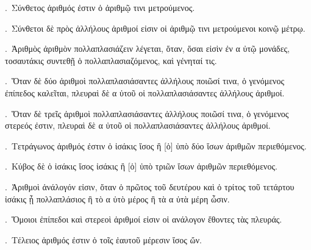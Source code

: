 \begin{Parallel}{}{}
{.~{\greekfont Σύνθετος ἀριθμός ἐστιν ὁ ἀριθμῷ τινι μετρούμενος.}

.~{\greekfont Σύνθετοι δὲ πρὸς ἀλλήλους ἀριθμοί εἰσιν οἱ ἀριθμῷ τινι μετρούμενοι κοινῷ μέτρῳ.}

.~{\greekfont Ἀριθμὸς ἀριθμὸν πολλαπλασιάζειν λέγεται, ὅταν, ὅσαι
εἰσὶν ἐν α ὐτῷ μονάδες, τοσαυτάκις συντεθῇ ὁ πολλαπλασιαζόμενος,
καὶ γένηταί τις.}

.~{\greekfont Ὅταν δὲ δύο ἀριθμοὶ πολλαπλασιάσαντες ἀλλήλους ποιῶσί τινα, ὁ γενόμενος ἐπίπεδος καλεῖται, πλευραὶ δὲ α ὐτοῦ οἱ
πολλαπλασιάσαντες ἀλλήλους ἀριθμοί.}

.~{\greekfont Ὅταν δὲ τρεῖς ἀριθμοὶ πολλαπλασιάσαντες ἀλλήλους ποιῶσί τινα, ὁ γενόμενος στερεός ἐστιν, πλευραὶ δὲ α ὐτοῦ οἱ
πολλαπλασιάσαντες ἀλλήλους ἀριθμοί.}

.~{\greekfont Τετράγωνος ἀριθμός ἐστιν ὁ ἰσάκις ἴσος ἢ [ὁ]
ὑπὸ δύο ἴσων ἀριθμῶν περιεθόμενος.}

.~{\greekfont Κύβος δὲ ὁ ἰσάκις ἴσος ἰσάκις ἢ [ὁ] ὑπὸ
τριῶν ἴσων ἀριθμῶν περιεθόμενος.}

.~{\greekfont Ἀριθμοὶ ἀνάλογόν εἰσιν, ὅταν ὁ πρῶτος
τοῦ δευτέρου καὶ ὁ τρίτος τοῦ τετάρτου ἰσάκις ᾖ
πολλαπλάσιος ἢ τὸ α ὐτὸ μέρος ἢ τὰ α ὐτὰ μέρη
ὦσιν.}

.~{\greekfont Ὅμοιοι ἐπίπεδοι καὶ στερεοὶ ἀριθμοί εἰσιν οἱ ανάλογον ἔθοντες τὰς πλευράς.}

.~{\greekfont Τέλειος ἀριθμός ἐστιν ὁ τοῖς ἑαυτοῦ
μέρεσιν ἴσος ὤν.}}

\end{Parallel}
